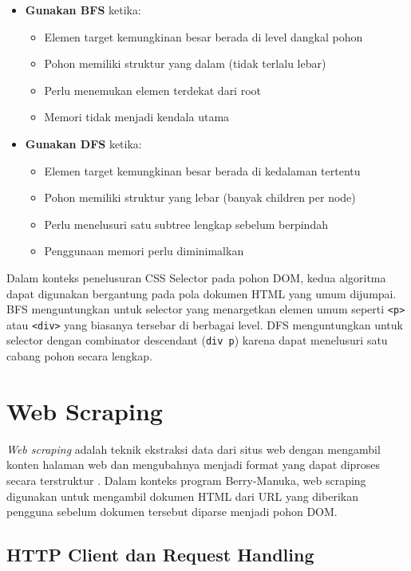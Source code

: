 \begin{itemize}
    \item \textbf{Gunakan BFS} ketika:
    \begin{itemize}
        \item Elemen target kemungkinan besar berada di level dangkal pohon
        \item Pohon memiliki struktur yang dalam (tidak terlalu lebar)
        \item Perlu menemukan elemen terdekat dari root
        \item Memori tidak menjadi kendala utama
    \end{itemize}
    
    \item \textbf{Gunakan DFS} ketika:
    \begin{itemize}
        \item Elemen target kemungkinan besar berada di kedalaman tertentu
        \item Pohon memiliki struktur yang lebar (banyak children per node)
        \item Perlu menelusuri satu subtree lengkap sebelum berpindah
        \item Penggunaan memori perlu diminimalkan
    \end{itemize}
\end{itemize}

Dalam konteks penelusuran CSS Selector pada pohon DOM, kedua algoritma dapat
digunakan bergantung pada pola dokumen HTML yang umum dijumpai. BFS menguntungkan
untuk selector yang menargetkan elemen umum seperti \texttt{<p>} atau \texttt{<div>}
yang biasanya tersebar di berbagai level. DFS menguntungkan untuk selector dengan
combinator descendant (\texttt{div p}) karena dapat menelusuri satu cabang pohon
secara lengkap.

\section{Web Scraping}

\textit{Web scraping} adalah teknik ekstraksi data dari situs web dengan
mengambil konten halaman web dan mengubahnya menjadi format yang dapat diproses
secara terstruktur \cite{w3school_scraping}. Dalam konteks program Berry-Manuka,
web scraping digunakan untuk mengambil dokumen HTML dari URL yang diberikan
pengguna sebelum dokumen tersebut diparse menjadi pohon DOM.

\subsection{HTTP Client dan Request Handling}

